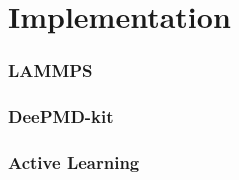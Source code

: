 \chapter{Implementation}

\subsection{LAMMPS}

\subsection{DeePMD-kit}

\subsection{Active Learning}

